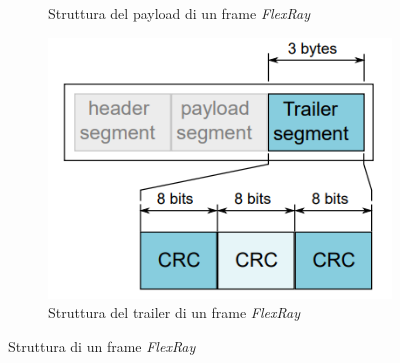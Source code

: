 \begin{figure}[h]
\begin{subfigure}{0.4\textwidth}
        \caption{Struttura del payload di un frame \emph{FlexRay}}
        \label{fig:flexray-payload}
    \end{subfigure}
    \centering
    \begin{subfigure}{0.4\textwidth}
        \vspace{0.3cm}
        \includegraphics[width=1\textwidth]{capitoli/figure-protocolli/flexray-trailer.png}
        \caption{Struttura del trailer di un frame \emph{FlexRay}}
        \label{fig:flexray-trailer}
    \end{subfigure}
    \caption{Struttura di un frame \emph{FlexRay}}
    \label{fig:flexray-frame-structure}
\end{figure}

